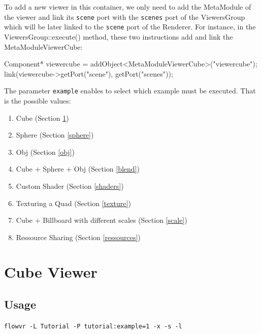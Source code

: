 \documentclass[a4paper,12pt,titlepage]{article}
\begin{document}
To add a new viewer in this container, we only need to add the MetaModule of the viewer and link its \texttt{scene} port with the \texttt{scenes} port of the ViewersGroup which will be later linked to the \texttt{scene} port of the Renderer. For instance, in the ViewersGroup::execute() method, these two instructions add and link the MetaModuleViewerCube:

\begin{codeflowvr_cpp}
    Component* viewercube = addObject<MetaModuleViewerCube>("viewercube");
    link(viewercube->getPort("scene"), getPort("scenes"));
\end{codeflowvr_cpp} \par

The parameter \texttt{example} enables to select which example must be executed. That is the possible values:
\begin{enumerate}
    \item Cube (Section \ref{cube})
    \item Sphere (Section \ref{sphere})
    \item Obj (Section \ref{obj})
    \item Cube + Sphere + Obj (Section \ref{blend})
    \item Custom Shader (Section \ref{shaders})
    \item Texturing a Quad (Section \ref{texture})
    \item Cube + Billboard with different scales (Section \ref{scale})
    \item Ressource Sharing (Section \ref{ressources})
\end{enumerate}

\section{Cube Viewer} 
\label{cube}

\subsection{Usage}

\texttt{flowvr -L Tutorial -P tutorial:example=1 -x -s -l}
\end{document}
